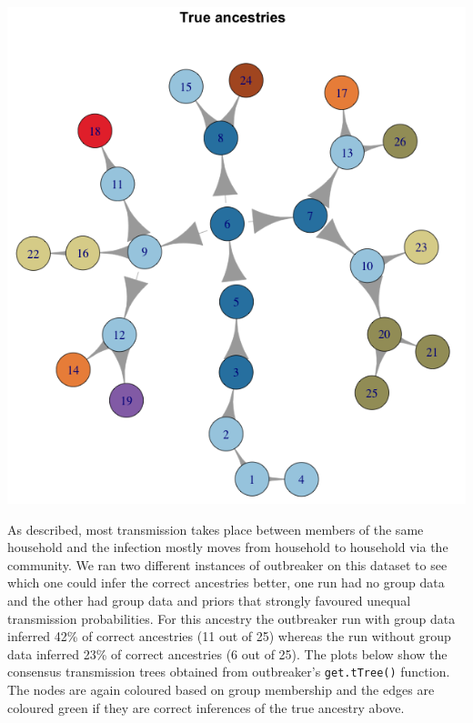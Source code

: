 \documentclass[11pt,a4paper]{report}
\begin{document}
\begin{center}
\includegraphics[scale=0.5]{ancestree.png}
\end{center}
As described, most transmission takes place between members of the same household and the infection mostly moves from household to household via the community. We ran two different instances of outbreaker on this dataset to see which one could infer the correct ancestries better, one run had no group data and the other had group data and priors that strongly favoured unequal transmission probabilities. For this ancestry the outbreaker run with group data inferred 42\% of correct ancestries (11 out of 25) whereas the run without group data inferred 23\% of correct ancestries (6 out of 25). The plots below show the consensus transmission trees obtained from outbreaker's {\tt get.tTree()} function. The nodes are again coloured based on group membership and the edges are coloured green if they are correct inferences of the true ancestry above.
\end{document}

